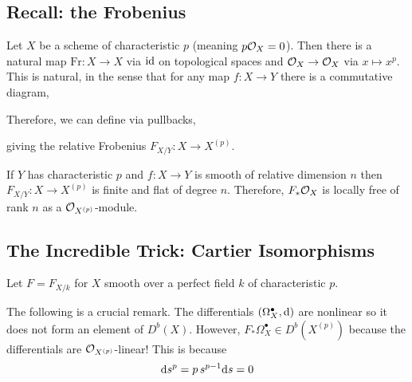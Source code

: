 \documentclass[12pt]{article}
\begin{document}
\subsection{Recall: the Frobenius}


\newcommand{\Fr}{\mathrm{Fr}}

\begin{defn}
Let $X$ be a scheme of characteristic $p$ (meaning $p \mathcal{O}_{X} = 0$). Then there is a natural map $\Fr : X \to X$ via $\mathrm{id}$ on topological spaces and $\mathcal{O}_{X} \to \mathcal{O}_{X}$ via $x \mapsto x^p$. This is natural, in the sense that for any map $f : X \to Y$ there is a commutative diagram,
\begin{center}
\end{center}
Therefore, we can define via pullbacks,
\begin{center}
\end{center}
giving the relative Frobenius $F_{X/Y} : X \to X^{(p)}$. 
\end{defn}

\begin{prop}
If $Y$ has characteristic $p$ and $f : X \to Y$ is smooth of relative dimension $n$ then $F_{X/Y} : X \to X^{(p)}$ is finite and flat of degree $n$. Therefore, $F_* \mathcal{O}_{X}$ is locally free of rank $n$ as a $\mathcal{O}_{X^{(p)}}$-module.
\end{prop}


\subsection{The Incredible Trick: Cartier Isomorphisms}

Let $F = F_{X/k}$ for $X$ smooth over a perfect field $k$ of characteristic $p$. 
\par 
The following is a crucial remark. The differentials $(\Omega_X^\bullet, \mathrm{d})$ are nonlinear so it does not form an element of $D^b(X)$. However, $F_* \Omega_X^\bullet \in D^b(X^{(p)})$ because the differentials are $\mathcal{O}_{X^{(p)}}$-linear! This is because 
\[ \mathrm{d}{s^p} = p \, s^{p-1} \mathrm{d}{s} = 0 \]
\end{document}
